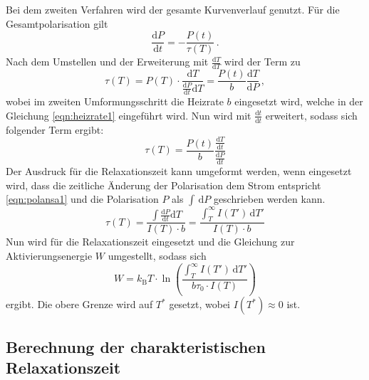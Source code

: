         \noindent Bei dem zweiten Verfahren wird der gesamte Kurvenverlauf genutzt. Für die Gesamtpolarisation gilt 
        \begin{equation*}
            \frac{\text{d}P}{\text{d}t} = -\frac{P(t)}{\tau(T)}\, .
        \end{equation*}
        Nach dem Umstellen und der Erweiterung mit $\frac{\text{d}T}{\text{d}T}$ wird der Term zu 
        \begin{equation*}
            \tau(T) = P(T) \cdot \frac{\text{d}T}{\frac{\text{d}P}{\text{d}t}\text{d}T } =  \frac{P(t)}{b} \frac{\text{d}T}{\text{d}P}\, ,
        \end{equation*}
        wobei im zweiten Umformungsschritt die Heizrate $b$ eingesetzt wird, welche in der Gleichung \eqref{eqn:heizrate1} eingeführt wird. 
        Nun wird mit $\frac{\text{d}t}{\text{d}t}$ erweitert, sodass sich folgender Term ergibt:
        \begin{equation*}
            \tau(T) = \frac{P(t)}{b} \frac{\frac{\text{d}T}{\text{d}t}}{\frac{\text{d}P}{\text{d}t}}
        \end{equation*}
        Der Ausdruck für die Relaxationszeit kann umgeformt werden, wenn eingesetzt wird, dass die zeitliche Änderung der Polarisation dem Strom entspricht \eqref{eqn:polansa1} 
        und die Polarisation $P$ als $\int \, \text{d}P$ geschrieben werden kann. 
        \begin{equation*}
            \tau(T) = \frac{\int \frac{\text{d}P}{\text{d}t} \text{d}T}{I(T) \cdot b} = \frac{\int_T^\infty I(T') \, \text{d}T'}{I(T) \cdot b}
        \end{equation*}
        Nun wird für die Relaxationszeit eingesetzt und die Gleichung zur Aktivierungsenergie $W$ umgestellt, sodass sich
        \begin{equation}
            W = k_\text{B} T \cdot \ln\left( \frac{\int_T^\infty I(T') \, \text{d}T'}{b \tau_0 \cdot I(T)}\right)
        \end{equation}
        ergibt. Die obere Grenze wird auf $T^*$ gesetzt, wobei $I(T^*) \approx 0$ ist. 


    \subsection{Berechnung der charakteristischen Relaxationszeit}

